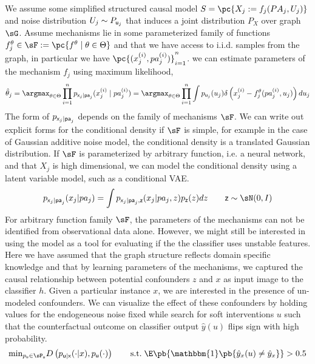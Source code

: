 \documentclass[11pt]{article}
\begin{document}
We assume some simplified structured causal model $S = \pc{X_j := f_j(PA_{j}, U_j)}$ and noise distribution $U_j\sim P_{\mathsf{u}_j}$ that induces a joint distribution $P_{X}$ over graph $\sG$. Assume mechanisms lie in some parameterized family of functions $f_j^{\theta} \in \sF := \pc{f^{\theta}\mid \theta\in\Theta}$ and that we have access to i.i.d. samples from the graph, in particular we have $\textstyle \pc{(x_j^{(i)},pa_{j}^{(i)})}_{i=1}^n$. we can estimate parameters of the mechanism $f_j$ using maximum likelihood,
\begin{align}
    \hat{\theta}_j
        = \argmax_{\theta\in\Theta} 
            \prod_{i=1}^n p_{\rx_j|\rpa_j}(x_j^{(i)} \mid pa_{j}^{(i)})
        = \argmax_{\theta\in\Theta}
            \prod_{i=1}^n \int p_{\ru_j}(u_j) \delta \left( x_j^{(i)} - f_j^{\theta}(pa_j^{(i)}, u_j) \right) du_j 
\end{align}
The form of $p_{\mathsf{x}_j\mid \mathsf{pa}_j}$ depends on the family of mechanisms $\sF$. We can write out explicit forms for the conditional density if $\sF$ is simple, for example in the case of Gaussian additive noise model, the conditional density is a translated Gaussian distribution. If $\sF$ is parameterized by arbitrary function, i.e. a neural network, and that $X_j$ is high dimensional, we can model the conditional density using a latent variable model, such as a conditional VAE.
\begin{align}
    p_{\rx_j|\rpa_j}(x_j|pa_j)
        = \int p_{\rx_j|\rpa_j,\rz}(x_j|pa_j,z) p_{\rz}(z) dz
        \qquad
        \rz \sim \sN(0,I)
\end{align}
For arbitrary function family $\sF$, the parameters of the mechanisms can not be identified from observational data alone. However, we might still be interested in using the model as a tool for evaluating if the the classifier uses unstable features. Here we have assumed that the graph structure reflects domain specific knowledge and that by learning parameters of the mechanisms, we captured the causal relationship between potential confounders $z$ and $x$ as input image to the classifier $h$. Given a particular instance $x$, we are interested in the presence of un-modeled confounders. We can visualize the effect of these confounders by holding values for the endogeneous noise fixed while search for soft interventions $u$ such that the counterfactual outcome on classifier output $\hat{y}(u)$ flips sign with high probability.
\begin{align}
    \text{min}_{p_{\ru}\in \sP_{\ru}} D\left(p_{\ru|\rx}(\cdot|x),p_{\ru}(\cdot)\right)
    \qquad
    \text{s.t.}\;
    \E\pb{ \mathbbm{1}\pb{\hat{y}_{x}(u) \neq \hat{y}_x} }  > 0.5
\end{align}



 
\newpage
\printbibliography 
\end{document}
